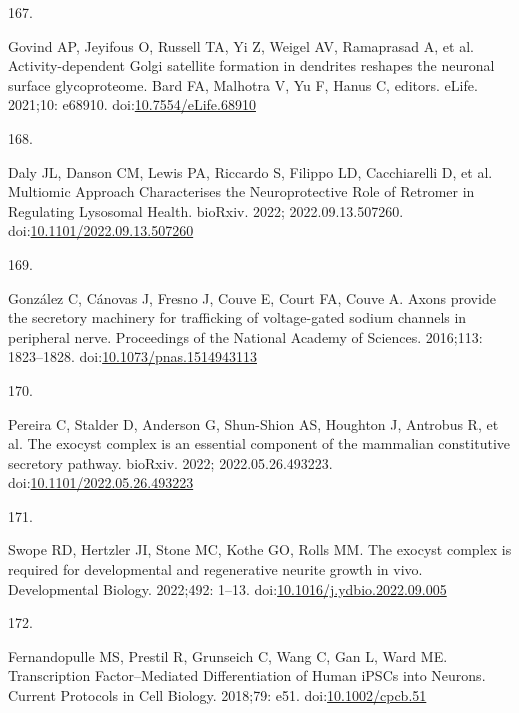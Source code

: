 \documentclass[
  12pt,
  a4paper,
]{book}
\newlength{\cslhangindent}
\newlength{\csllabelwidth}
\newenvironment{CSLReferences}[2] %
 {\begin{list}{}{%
  \setlength{\itemindent}{0pt}
  \setlength{\leftmargin}{0pt}
  \setlength{\parsep}{0pt}
  \ifodd #1
   \setlength{\leftmargin}{\cslhangindent}
   \setlength{\itemindent}{-1\cslhangindent}
  \fi
  \setlength{\itemsep}{#2\baselineskip}}}
 {\end{list}}
\newcommand{\CSLLeftMargin}[1]{\parbox[t]{\csllabelwidth}{\strut#1\strut}}
\newcommand{\CSLRightInline}[1]{\parbox[t]{\linewidth - \csllabelwidth}{\strut#1\strut}}
\begin{document}
\begin{CSLReferences}{0}{1}
\CSLLeftMargin{167. }%
\CSLRightInline{Govind AP, Jeyifous O, Russell TA, Yi Z, Weigel AV, Ramaprasad A, et al. Activity-dependent {Golgi} satellite formation in dendrites reshapes the neuronal surface glycoproteome. Bard FA, Malhotra V, Yu F, Hanus C, editors. eLife. 2021;10: e68910. doi:\href{https://doi.org/10.7554/eLife.68910}{10.7554/eLife.68910}}

\CSLLeftMargin{168. }%
\CSLRightInline{Daly JL, Danson CM, Lewis PA, Riccardo S, Filippo LD, Cacchiarelli D, et al. Multiomic {Approach Characterises} the {Neuroprotective Role} of {Retromer} in {Regulating Lysosomal Health}. bioRxiv. 2022; 2022.09.13.507260. doi:\href{https://doi.org/10.1101/2022.09.13.507260}{10.1101/2022.09.13.507260}}

\CSLLeftMargin{169. }%
\CSLRightInline{González C, Cánovas J, Fresno J, Couve E, Court FA, Couve A. Axons provide the secretory machinery for trafficking of voltage-gated sodium channels in peripheral nerve. Proceedings of the National Academy of Sciences. 2016;113: 1823--1828. doi:\href{https://doi.org/10.1073/pnas.1514943113}{10.1073/pnas.1514943113}}

\CSLLeftMargin{170. }%
\CSLRightInline{Pereira C, Stalder D, Anderson G, Shun-Shion AS, Houghton J, Antrobus R, et al. The exocyst complex is an essential component of the mammalian constitutive secretory pathway. bioRxiv. 2022; 2022.05.26.493223. doi:\href{https://doi.org/10.1101/2022.05.26.493223}{10.1101/2022.05.26.493223}}

\CSLLeftMargin{171. }%
\CSLRightInline{Swope RD, Hertzler JI, Stone MC, Kothe GO, Rolls MM. The exocyst complex is required for developmental and regenerative neurite growth in vivo. Developmental Biology. 2022;492: 1--13. doi:\href{https://doi.org/10.1016/j.ydbio.2022.09.005}{10.1016/j.ydbio.2022.09.005}}

\CSLLeftMargin{172. }%
\CSLRightInline{Fernandopulle MS, Prestil R, Grunseich C, Wang C, Gan L, Ward ME. Transcription {Factor}--{Mediated Differentiation} of {Human iPSCs} into {Neurons}. Current Protocols in Cell Biology. 2018;79: e51. doi:\href{https://doi.org/10.1002/cpcb.51}{10.1002/cpcb.51}}


\end{CSLReferences}
\end{document}
